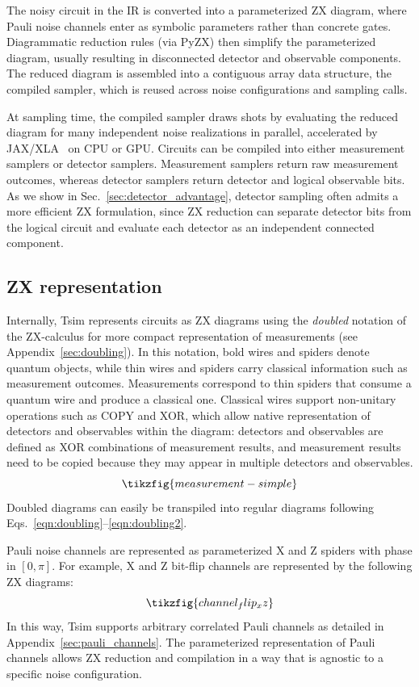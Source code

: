 \documentclass[
  a4paper,
  onecolumn,
  11pt,
  allowtoday
]{quantumarticle}
\begin{document}
The noisy circuit in the IR is converted into a parameterized ZX diagram, where Pauli noise channels enter as symbolic parameters rather than concrete gates. Diagrammatic reduction rules (via PyZX) then simplify the parameterized diagram, usually resulting in disconnected detector and observable components. The reduced diagram is assembled into a contiguous array data structure, the compiled sampler, which is reused across noise configurations and sampling calls.

At sampling time, the compiled sampler draws shots by evaluating the reduced diagram for many independent noise realizations in parallel, accelerated by JAX/XLA~\cite{jax2018github} on CPU or GPU. Circuits can be compiled into either measurement samplers or detector samplers. Measurement samplers return raw measurement outcomes, whereas detector samplers return detector and logical observable bits. As we show in Sec.~\ref{sec:detector_advantage}, detector sampling often admits a more efficient ZX formulation, since ZX reduction can separate detector bits from the logical circuit and evaluate each detector as an independent connected component.


\subsection{ZX representation}
Internally, Tsim represents circuits as ZX diagrams using the \textit{doubled} notation of the ZX-calculus for more compact representation of measurements (see Appendix~\ref{sec:doubling}). In this notation, bold wires and spiders denote quantum objects, while thin wires and spiders carry classical information such as measurement outcomes. Measurements correspond to thin spiders that consume a quantum wire and produce a classical one. Classical wires support non-unitary operations such as COPY and XOR, which allow native representation of detectors and observables within the diagram: detectors and observables are defined as XOR combinations of measurement results, and measurement results need to be copied because they may appear in multiple detectors and observables.
\begin{equation}
  \tikzfig{measurement-simple}
  \label{eqn:doubled_notation}
\end{equation}
Doubled diagrams can easily be transpiled into regular diagrams following Eqs.~\eqref{eqn:doubling}--\eqref{eqn:doubling2}.

Pauli noise channels are represented as parameterized X and Z spiders with phase in $[0,\pi]$.
For example, X and Z bit-flip channels are represented by the following ZX diagrams:
\begin{equation}
  \tikzfig{channel_flip_xz}
\end{equation}
In this way, Tsim supports arbitrary correlated Pauli channels as detailed in Appendix~\ref{sec:pauli_channels}.
The parameterized representation of Pauli channels allows ZX reduction and compilation in a way that
is agnostic to a specific noise configuration.
\end{document}
